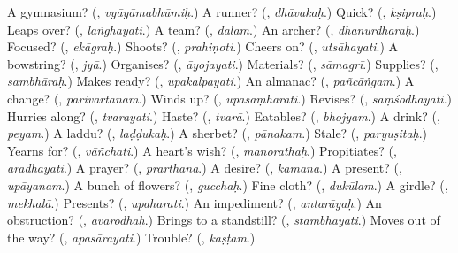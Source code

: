 \begin{tcolorbox}[breakable,colback=teal!4,colframe=teal!35!black,title={Before you move on}]
A gymnasium? (\textbf{}, \emph{vyāyāmabhūmiḥ}.) A runner? (\textbf{}, \emph{dhāvakaḥ}.) Quick? (\textbf{}, \emph{kṣipraḥ}.) Leaps over? (\textbf{}, \emph{laṅghayati}.) A team? (\textbf{}, \emph{dalam}.) An archer? (\textbf{}, \emph{dhanurdharaḥ}.) Focused? (\textbf{}, \emph{ekāgraḥ}.) Shoots? (\textbf{}, \emph{prahiṇoti}.) Cheers on? (\textbf{}, \emph{utsāhayati}.) A bowstring? (\textbf{}, \emph{jyā}.) Organises? (\textbf{}, \emph{āyojayati}.) Materials? (\textbf{}, \emph{sāmagrī}.) Supplies? (\textbf{}, \emph{sambhāraḥ}.) Makes ready? (\textbf{}, \emph{upakalpayati}.) An almanac? (\textbf{}, \emph{pañcāṅgam}.) A change? (\textbf{}, \emph{parivartanam}.) Winds up? (\textbf{}, \emph{upasaṃharati}.) Revises? (\textbf{}, \emph{saṃśodhayati}.) Hurries along? (\textbf{}, \emph{tvarayati}.) Haste? (\textbf{}, \emph{tvarā}.) Eatables? (\textbf{}, \emph{bhojyam}.) A drink? (\textbf{}, \emph{peyam}.) A laddu? (\textbf{}, \emph{laḍḍukaḥ}.) A sherbet? (\textbf{}, \emph{pānakam}.) Stale? (\textbf{}, \emph{paryuṣitaḥ}.) Yearns for? (\textbf{}, \emph{vāñchati}.) A heart's wish? (\textbf{}, \emph{manorathaḥ}.) Propitiates? (\textbf{}, \emph{ārādhayati}.) A prayer? (\textbf{}, \emph{prārthanā}.) A desire? (\textbf{}, \emph{kāmanā}.) A present? (\textbf{}, \emph{upāyanam}.) A bunch of flowers? (\textbf{}, \emph{gucchaḥ}.) Fine cloth? (\textbf{}, \emph{dukūlam}.) A girdle? (\textbf{}, \emph{mekhalā}.) Presents? (\textbf{}, \emph{upaharati}.) An impediment? (\textbf{}, \emph{antarāyaḥ}.) An obstruction? (\textbf{}, \emph{avarodhaḥ}.) Brings to a standstill? (\textbf{}, \emph{stambhayati}.) Moves out of the way? (\textbf{}, \emph{apasārayati}.) Trouble? (\textbf{}, \emph{kaṣṭam}.)
\end{tcolorbox}
